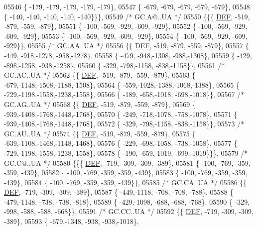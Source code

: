 \begin{DoxyCode}
05546 \{ -179, -179, -179, -179, -179\},
05547 \{ -679, -679, -679, -679, -679\},
05548 \{ -140, -140, -140, -140, -140\}\}\},
05549 \textcolor{comment}{/* GC.A@..UA */}
05550 \{\{\{  \mbox{\hyperlink{1_88_84__epars_8h_a397419fc12b37ed479c8abb9d444d843}{DEF}}, -519, -879, -559, -879\},
05551 \{ -100, -569, -929, -609, -929\},
05552 \{ -100, -569, -929, -609, -929\},
05553 \{ -100, -569, -929, -609, -929\},
05554 \{ -100, -569, -929, -609, -929\}\},
05555 \textcolor{comment}{/* GC.AA..UA */}
05556 \{\{  \mbox{\hyperlink{1_88_84__epars_8h_a397419fc12b37ed479c8abb9d444d843}{DEF}}, -519, -879, -559, -879\},
05557 \{ -449, -918,-1278, -958,-1278\},
05558 \{ -479, -948,-1308, -988,-1308\},
05559 \{ -429, -898,-1258, -938,-1258\},
05560 \{ -329, -798,-1158, -838,-1158\}\},
05561 \textcolor{comment}{/* GC.AC..UA */}
05562 \{\{  \mbox{\hyperlink{1_88_84__epars_8h_a397419fc12b37ed479c8abb9d444d843}{DEF}}, -519, -879, -559, -879\},
05563 \{ -679,-1148,-1508,-1188,-1508\},
05564 \{ -559,-1028,-1388,-1068,-1388\},
05565 \{ -729,-1198,-1558,-1238,-1558\},
05566 \{ -189, -658,-1018, -698,-1018\}\},
05567 \textcolor{comment}{/* GC.AG..UA */}
05568 \{\{  \mbox{\hyperlink{1_88_84__epars_8h_a397419fc12b37ed479c8abb9d444d843}{DEF}}, -519, -879, -559, -879\},
05569 \{ -939,-1408,-1768,-1448,-1768\},
05570 \{ -249, -718,-1078, -758,-1078\},
05571 \{ -939,-1408,-1768,-1448,-1768\},
05572 \{ -329, -798,-1158, -838,-1158\}\},
05573 \textcolor{comment}{/* GC.AU..UA */}
05574 \{\{  \mbox{\hyperlink{1_88_84__epars_8h_a397419fc12b37ed479c8abb9d444d843}{DEF}}, -519, -879, -559, -879\},
05575 \{ -639,-1108,-1468,-1148,-1468\},
05576 \{ -229, -698,-1058, -738,-1058\},
05577 \{ -729,-1198,-1558,-1238,-1558\},
05578 \{ -190, -659,-1019, -699,-1019\}\}\},
05579 \textcolor{comment}{/* GC.C@..UA */}
05580 \{\{\{  \mbox{\hyperlink{1_88_84__epars_8h_a397419fc12b37ed479c8abb9d444d843}{DEF}}, -719, -309, -309, -389\},
05581 \{ -100, -769, -359, -359, -439\},
05582 \{ -100, -769, -359, -359, -439\},
05583 \{ -100, -769, -359, -359, -439\},
05584 \{ -100, -769, -359, -359, -439\}\},
05585 \textcolor{comment}{/* GC.CA..UA */}
05586 \{\{  \mbox{\hyperlink{1_88_84__epars_8h_a397419fc12b37ed479c8abb9d444d843}{DEF}}, -719, -309, -309, -389\},
05587 \{ -449,-1118, -708, -708, -788\},
05588 \{ -479,-1148, -738, -738, -818\},
05589 \{ -429,-1098, -688, -688, -768\},
05590 \{ -329, -998, -588, -588, -668\}\},
05591 \textcolor{comment}{/* GC.CC..UA */}
05592 \{\{  \mbox{\hyperlink{1_88_84__epars_8h_a397419fc12b37ed479c8abb9d444d843}{DEF}}, -719, -309, -309, -389\},
05593 \{ -679,-1348, -938, -938,-1018\},

\end{DoxyCode}
